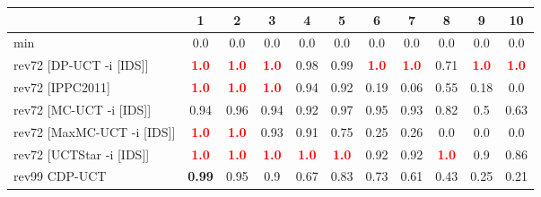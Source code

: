 \documentclass{article}
\begin{document}
\begin{tabular}{|l|r@{$\pm$}rr@{$\pm$}rr@{$\pm$}rr@{$\pm$}rr@{$\pm$}rr@{$\pm$}rr@{$\pm$}rr@{$\pm$}rr@{$\pm$}rr@{$\pm$}r|}
\hline

& \multicolumn{2}{c}{1}
& \multicolumn{2}{c}{2}
& \multicolumn{2}{c}{3}
& \multicolumn{2}{c}{4}
& \multicolumn{2}{c}{5}
& \multicolumn{2}{c}{6}
& \multicolumn{2}{c}{7}
& \multicolumn{2}{c}{8}
& \multicolumn{2}{c}{9}
& \multicolumn{2}{c|}{10}
\\
\hline
\hline
min
& \multicolumn{2}{c}{0.0}
& \multicolumn{2}{c}{0.0}
& \multicolumn{2}{c}{0.0}
& \multicolumn{2}{c}{0.0}
& \multicolumn{2}{c}{0.0}
& \multicolumn{2}{c}{0.0}
& \multicolumn{2}{c}{0.0}
& \multicolumn{2}{c}{0.0}
& \multicolumn{2}{c}{0.0}
& \multicolumn{2}{c|}{0.0}
\\
rev72 [DP-UCT -i [IDS]]
& \multicolumn{2}{c}{\textbf{\textcolor{red}{1.0}}}
& \multicolumn{2}{c}{\textbf{\textcolor{red}{1.0}}}
& \multicolumn{2}{c}{\textbf{\textcolor{red}{1.0}}}
& \multicolumn{2}{c}{0.98}
& \multicolumn{2}{c}{0.99}
& \multicolumn{2}{c}{\textbf{\textcolor{red}{1.0}}}
& \multicolumn{2}{c}{\textbf{\textcolor{red}{1.0}}}
& \multicolumn{2}{c}{0.71}
& \multicolumn{2}{c}{\textbf{\textcolor{red}{1.0}}}
& \multicolumn{2}{c|}{\textbf{\textcolor{red}{1.0}}}
\\
rev72 [IPPC2011]
& \multicolumn{2}{c}{\textbf{\textcolor{red}{1.0}}}
& \multicolumn{2}{c}{\textbf{\textcolor{red}{1.0}}}
& \multicolumn{2}{c}{\textbf{\textcolor{red}{1.0}}}
& \multicolumn{2}{c}{0.94}
& \multicolumn{2}{c}{0.92}
& \multicolumn{2}{c}{0.19}
& \multicolumn{2}{c}{0.06}
& \multicolumn{2}{c}{0.55}
& \multicolumn{2}{c}{0.18}
& \multicolumn{2}{c|}{0.0}
\\
rev72 [MC-UCT -i [IDS]]
& \multicolumn{2}{c}{0.94}
& \multicolumn{2}{c}{0.96}
& \multicolumn{2}{c}{0.94}
& \multicolumn{2}{c}{0.92}
& \multicolumn{2}{c}{0.97}
& \multicolumn{2}{c}{0.95}
& \multicolumn{2}{c}{0.93}
& \multicolumn{2}{c}{0.82}
& \multicolumn{2}{c}{0.5}
& \multicolumn{2}{c|}{0.63}
\\
rev72 [MaxMC-UCT -i [IDS]]
& \multicolumn{2}{c}{\textbf{\textcolor{red}{1.0}}}
& \multicolumn{2}{c}{\textbf{\textcolor{red}{1.0}}}
& \multicolumn{2}{c}{0.93}
& \multicolumn{2}{c}{0.91}
& \multicolumn{2}{c}{0.75}
& \multicolumn{2}{c}{0.25}
& \multicolumn{2}{c}{0.26}
& \multicolumn{2}{c}{0.0}
& \multicolumn{2}{c}{0.0}
& \multicolumn{2}{c|}{0.0}
\\
rev72 [UCTStar -i [IDS]]
& \multicolumn{2}{c}{\textbf{\textcolor{red}{1.0}}}
& \multicolumn{2}{c}{\textbf{\textcolor{red}{1.0}}}
& \multicolumn{2}{c}{\textbf{\textcolor{red}{1.0}}}
& \multicolumn{2}{c}{\textbf{\textcolor{red}{1.0}}}
& \multicolumn{2}{c}{\textbf{\textcolor{red}{1.0}}}
& \multicolumn{2}{c}{0.92}
& \multicolumn{2}{c}{0.92}
& \multicolumn{2}{c}{\textbf{\textcolor{red}{1.0}}}
& \multicolumn{2}{c}{0.9}
& \multicolumn{2}{c|}{0.86}
\\
\hline
rev99 CDP-UCT
& \multicolumn{2}{c}{\textbf{0.99}}
& \multicolumn{2}{c}{0.95}
& \multicolumn{2}{c}{0.9}
& \multicolumn{2}{c}{0.67}
& \multicolumn{2}{c}{0.83}
& \multicolumn{2}{c}{0.73}
& \multicolumn{2}{c}{0.61}
& \multicolumn{2}{c}{0.43}
& \multicolumn{2}{c}{0.25}
& \multicolumn{2}{c|}{0.21}
\\
\hline
\end{tabular}%
\end{document}
